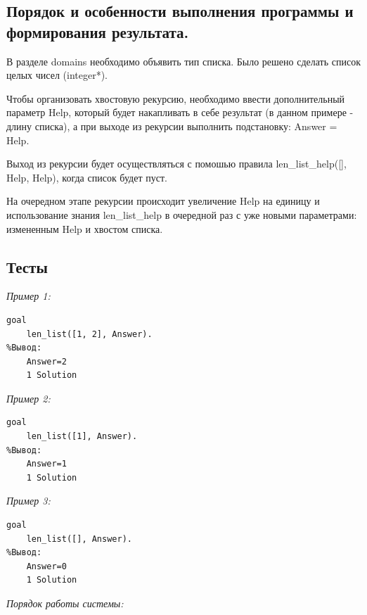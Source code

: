 \documentclass[a4paper,12pt]{article}
\begin{document}
\subsection*{Порядок и особенности выполнения программы и формирования результата.}

В разделе domains необходимо объявить тип списка. Было решено сделать список целых чисел (integer*).

Чтобы организовать хвостовую рекурсию, необходимо ввести дополнительный параметр Help, который будет накапливать в себе результат (в данном примере - длину списка), а при выходе из рекурсии выполнить подстановку: Answer = Help.

Выход из рекурсии будет осуществляться с помошью правила len\_list\_help([], Help, Help), когда список будет пуст.

На очередном этапе рекурсии происходит увеличение Help на единицу и использование знания len\_list\_help в очередной раз с уже новыми параметрами: измененным Help и хвостом списка.

\subsection*{Тесты}

\textit{Пример 1:}

\begin{verbatim}
goal
	len_list([1, 2], Answer).
%Вывод:
	Answer=2
	1 Solution
\end{verbatim}

\textit{Пример 2:}

\begin{verbatim}
goal
	len_list([1], Answer).
%Вывод:
	Answer=1
	1 Solution
\end{verbatim}

\textit{Пример 3:}

\begin{verbatim}
goal
	len_list([], Answer).
%Вывод:
	Answer=0
	1 Solution
\end{verbatim}

\textit{Порядок работы системы:}
\end{document}

